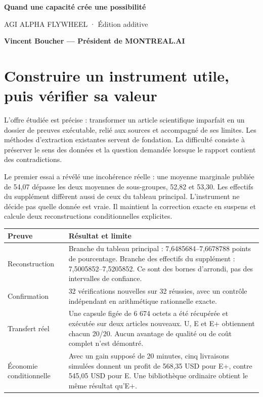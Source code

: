 \documentclass[10pt]{article}
\begin{document}
{\sffamily\bfseries\fontsize{18}{22}\selectfont\color{navy}Quand une capacité crée une possibilité\par}
\vspace{2mm}
{\sffamily AGI ALPHA FLYWHEEL · Édition additive\par}
\textbf{Vincent Boucher — Président de MONTREAL.AI}

\section*{Construire un instrument utile, puis vérifier sa valeur}

L'offre étudiée est précise : transformer un article scientifique imparfait en un dossier de preuves exécutable, relié aux sources et accompagné de ses limites. Les méthodes d'extraction existantes servent de fondation. La difficulté consiste à préserver le sens des données et la question demandée lorsque le rapport contient des contradictions.

Le premier essai a révélé une incohérence réelle : une moyenne marginale publiée de 54,07 dépasse les deux moyennes de sous-groupes, 52,82 et 53,30. Les effectifs du supplément diffèrent aussi de ceux du tableau principal. L'instrument ne décide pas quelle donnée est vraie. Il maintient la correction exacte en suspens et calcule deux reconstructions conditionnelles explicites.

\begin{tabularx}{\textwidth}{p{}Y}
\toprule Preuve & Résultat et limite\\\midrule
Reconstruction & Branche du tableau principal : 7,6485684--7,6678788 points de pourcentage. Branche des effectifs du supplément : 7,5005852--7,5205852. Ce sont des bornes d'arrondi, pas des intervalles de confiance.\\
Confirmation & 32 vérifications nouvelles sur 32 réussies, avec un contrôle indépendant en arithmétique rationnelle exacte.\\
Transfert réel & Une capsule figée de 6 674 octets a été récupérée et exécutée sur deux articles nouveaux. U, E et E+ obtiennent chacun 20/20. Aucun avantage de qualité ou de coût complet n'est démontré.\\
Économie conditionnelle & Avec un gain supposé de 20 minutes, cinq livraisons simulées donnent un profit de 568,35 USD pour E+, contre 545,05 USD pour E. Une bibliothèque ordinaire obtient le même résultat qu'E+.\\\bottomrule
\end{tabularx}
\end{document}

